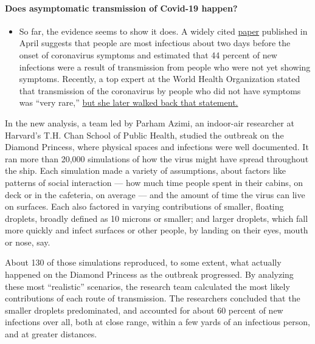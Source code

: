 \begin{itemize}
{  \paragraph{Does asymptomatic transmission of Covid-19
  happen?}\label{does-asymptomatic-transmission-of-covid-19-happen}}

  \begin{itemize}
  \tightlist
  \item
    So far, the evidence seems to show it does. A widely cited
    \href{https://www.nature.com/articles/s41591-020-0869-5}{paper}
    published in April suggests that people are most infectious about
    two days before the onset of coronavirus symptoms and estimated that
    44 percent of new infections were a result of transmission from
    people who were not yet showing symptoms. Recently, a top expert at
    the World Health Organization stated that transmission of the
    coronavirus by people who did not have symptoms was ``very rare,''
    \href{https://www.nytimes.com/2020/06/09/world/coronavirus-updates.html?action=click\&pgtype=Article\&state=default\&region=MAIN_CONTENT_3\&context=storylines_faq\#link-1f302e21}{but
    she later walked back that statement.}
  \end{itemize}
\end{itemize}

In the new analysis, a team led by Parham Azimi, an indoor-air
researcher at Harvard's T.H. Chan School of Public Health, studied the
outbreak on the Diamond Princess, where physical spaces and infections
were well documented. It ran more than 20,000 simulations of how the
virus might have spread throughout the ship. Each simulation made a
variety of assumptions, about factors like patterns of social
interaction --- how much time people spent in their cabins, on deck or
in the cafeteria, on average --- and the amount of time the virus can
live on surfaces. Each also factored in varying contributions of
smaller, floating droplets, broadly defined as 10 microns or smaller;
and larger droplets, which fall more quickly and infect surfaces or
other people, by landing on their eyes, mouth or nose, say.

About 130 of those simulations reproduced, to some extent, what actually
happened on the Diamond Princess as the outbreak progressed. By
analyzing these most ``realistic'' scenarios, the research team
calculated the most likely contributions of each route of transmission.
The researchers concluded that the smaller droplets predominated, and
accounted for about 60 percent of new infections over all, both at close
range, within a few yards of an infectious person, and at greater
distances.

